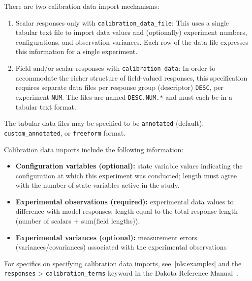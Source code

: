 There are two calibration data import mechanisms:
\begin{enumerate}
\item Scalar responses only with \texttt{calibration\_data\_file}: This
  uses a single tabular text file to import data values and
  (optionally) experiment numbers, configurations, and observation
  variances.  Each row of the data file expresses this information for
  a single experiment.

\item Field and/or scalar responses with \texttt{calibration\_data}:
  In order to accommodate the richer structure of field-valued
  responses, this specification requires separate data files per
  response group (descriptor) {\tt DESC}, per experiment {\tt NUM}.
  The files are named \texttt{DESC.NUM.*} and must each be in a
  tabular text format.
\end{enumerate}
The tabular data files may be specified to be {\tt annotated}
(default), {\tt custom\_annotated}, or {\tt freeform} format.

Calibration data imports include the following information:
\begin{itemize}
\item {\bf Configuration variables (optional):} state variable values
  indicating the configuration at which this experiment was conducted;
  length must agree with the number of state variables active in the
  study.
\item {\bf Experimental observations (required):} experimental data
  values to difference with model responses; length equal to the total
  response length (number of scalars + sum(field lengths)).
\item {\bf Experimental variances (optional):} measurement errors
  (variances/covariances) associated with the experimental
  observations
\end{itemize}

For specifics on specifying calibration data imports,
see~\ref{nls:examples} and the \texttt{responses} \textgreater 
\texttt{calibration\_terms} keyword in the Dakota Reference
Manual~\cite{RefMan}.

